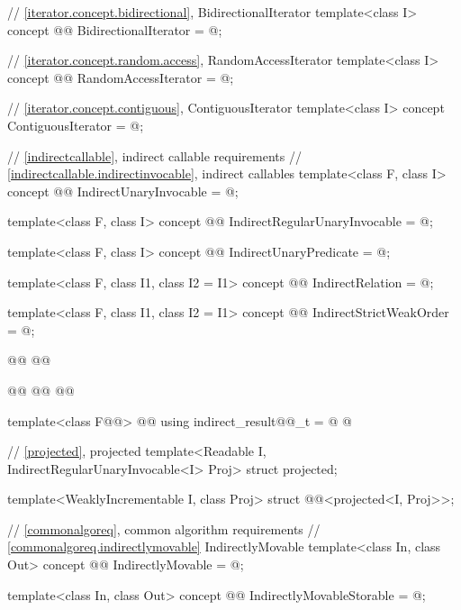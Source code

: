 \begin{addedblock}
\begin{codeblock}
  // \ref{iterator.concept.bidirectional}, BidirectionalIterator
  template<class I>
  concept @@ BidirectionalIterator = @\seebelownc@;

  // \ref{iterator.concept.random.access}, RandomAccessIterator
  template<class I>
  concept @@ RandomAccessIterator = @\seebelownc@;

  // \ref{iterator.concept.contiguous}, ContiguousIterator
  template<class I>
  concept ContiguousIterator = @\seebelownc@;

  // \ref{indirectcallable}, indirect callable requirements
  // \ref{indirectcallable.indirectinvocable}, indirect callables
  template<class F, class I>
  concept @@ IndirectUnaryInvocable = @\seebelownc@;

  template<class F, class I>
  concept @@ IndirectRegularUnaryInvocable = @\seebelownc@;

  template<class F, class I>
  concept @@ IndirectUnaryPredicate = @\seebelownc@;

  template<class F, class I1, class I2 = I1>
  concept @@ IndirectRelation = @\seebelownc@;

  template<class F, class I1, class I2 = I1>
  concept @@ IndirectStrictWeakOrder = @\seebelownc@;

  @@
  @@

  @@
    @@
  @@

  template<class F@@>
    @@
  using indirect_result@@_t
    = @ @

  // \ref{projected}, projected
  template<Readable I, IndirectRegularUnaryInvocable<I> Proj>
  struct projected;

  template<WeaklyIncrementable I, class Proj>
  struct @@<projected<I, Proj>>;

  // \ref{commonalgoreq}, common algorithm requirements
  // \ref{commonalgoreq.indirectlymovable} IndirectlyMovable
  template<class In, class Out>
  concept @@ IndirectlyMovable = @\seebelownc@;

  template<class In, class Out>
  concept @@ IndirectlyMovableStorable = @\seebelownc@;


\end{codeblock}
\end{addedblock}
